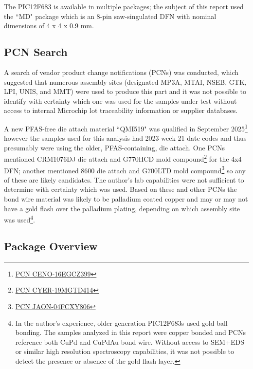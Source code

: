 \documentclass[letterpaper]{article}
\begin{document}
The PIC12F683 is available in multiple packages; the subject of this report used the ``MD" package which is an 8-pin saw-singulated DFN with nominal dimensions of 4 x 4 x 0.9 mm.

\subsection{PCN Search}

A search of vendor product change notifications (PCNs) was conducted, which suggested that numerous assembly sites (designated MP3A, MTAI, NSEB, GTK, LPI, UNIS, and MMT) were used to produce this part and it was not possible to identify with certainty which one was used for the samples under test without access to internal Microchip lot traceability information or supplier databases.

A new PFAS-free die attach material ``QMI519" was qualified in September 2025\footnote{\href{https://www.microchip.com/PCNWebAPI/api/pcn/DownloadPcnDocument?pcnid=24234&fileName=PFAS\%20Elimination\%20and\%20Die\%20Attach_Explanation.pdf}{PCN CENO-16EGCZ399}} however the samples used for this analysis had 2023 week 21 date codes and thus presumably were using the older, PFAS-containing, die attach. One PCNs mentioned CRM1076DJ die attach and G770HCD mold compound\footnote{\href{https://www.microchip.com/PCNWebAPI/api/pcn/DownloadPcnDocument?pcnId=252&affectedcpns=pdf}{PCN CYER-19MGTD414}} for the 4x4 DFN; another mentioned 8600 die attach and G700LTD mold compound\footnote{\href{https://www.microchip.com/PCNWebAPI/api/pcn/DownloadPcnDocument?pcnid=6667&fileName=PCN_JAON-04FCXY806_Qual\%20Report.pdf}{PCN JAON-04FCXY806}} so any of these are likely candidates. The author's lab capabilities were not sufficient to determine with certainty which was used. Based on these and other PCNs the bond wire material was likely to be palladium coated copper and may or may not have a gold flash over the palladium plating, depending on which assembly site was used\footnote{In the author's experience, older generation PIC12F683s used gold ball bonding. The samples analyzed in this report were copper bonded and PCNs reference both CuPd and CuPdAu bond wire. Without access to SEM+EDS or similar high resolution spectroscopy capabilities, it was not possible to detect the presence or absence of the gold flash layer.}.

\subsection{Package Overview}
\end{document}
